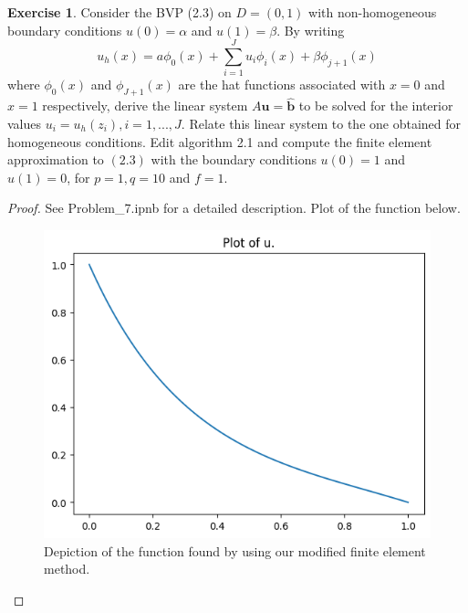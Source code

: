 \documentclass{amsart}
\theoremstyle{plain}
\theoremstyle{definition}
\newtheorem{exer}{Exercise}[section]
\begin{document}
\begin{exer}
    Consider the BVP (2.3) on $D = (0,1)$ with non-homogeneous boundary conditions $u(0)=\alpha$ and $u(1)=\beta.$ By writing 
    $$u_h(x) = a\phi_0(x) + \sum_{i=1}^{J} u_i \phi_i(x) + \beta \phi_{j+1}(x)$$
    where $\phi_0(x)$ and $\phi_{J+1}(x)$ are the hat functions associated with $x=0$ and $x=1$ respectively, derive the linear system $A\mathbf{u} = \hat{\mathbf{b}}$ to be solved for the interior values $u_i = u_h (z_i), i = 1,...,J.$ Relate this linear system to the one obtained for homogeneous conditions. Edit algorithm 2.1 and compute the finite element approximation to $(2.3)$ with the boundary conditions $u(0)=1$ and $u(1)=0$, for $p=1, q=10$ and $f=1.$
\end{exer}
\begin{proof}
    See Problem\_7.ipnb for a detailed description. Plot of the function below.
    \begin{figure}
        \centering
        \includegraphics[width=0.5\linewidth]{Exercises/Chapter 2/Photos/7_graph.png}
        \caption{Depiction of the function found by using our modified finite element method. }
        \label{fig:problem_7}
    \end{figure}
\end{proof}
\end{document}
